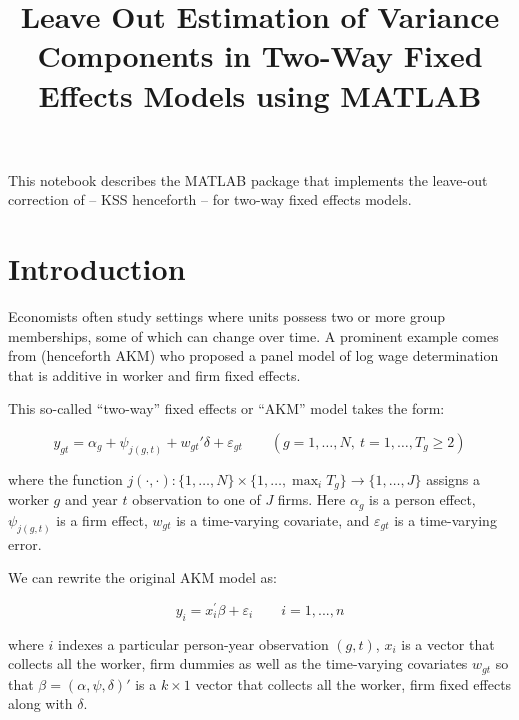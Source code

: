 \documentclass[11pt]{article}
\title{Leave Out Estimation of Variance Components in Two-Way Fixed Effects Models using MATLAB}
\begin{document}
    
        \maketitle
    
    

    
    This notebook describes the MATLAB package that implements the leave-out
correction of \cite*{kline2020leave} -- KSS henceforth -- for
two-way fixed effects models.

    \tableofcontents
    \newpage

    \hypertarget{introduction}{%
\section{Introduction}\label{introduction}}

Economists often study settings where units possess two or more group
memberships, some of which can change over time. A prominent example
comes from \cite{abowd1999high} (henceforth AKM) who
proposed a panel model of log wage determination that is additive in
worker and firm fixed effects.

This so-called ``two-way'' fixed effects or ``AKM'' model takes the
form:

\begin{equation}
    y_{gt} =  \alpha_{{g}} + \psi_{j({g},t)} + w_{gt}'\delta +  \varepsilon_{gt}  \qquad({g}=1,\dots,N, \ t=1,\dots,T_{g} \ge 2)
\end{equation}

where the function
\(j(\cdot ,\cdot ):\lbrace 1,\dots ,N\rbrace \times \lbrace 1,\dots ,\max_i T_g \rbrace \to \lbrace 1,\dots ,J\rbrace\)
assigns a worker \(g\) and year \(t\) observation to one of \(J\) firms.
Here \(\alpha_g\) is a person effect, \(\psi_{j(g,t)}\) is a firm
effect, \(w_{gt}\) is a time-varying covariate, and \(\varepsilon_{gt}\)
is a time-varying error.

We can rewrite the original AKM model as:

\begin{equation}
y_i =x_i^{\prime } \beta +\varepsilon_i \qquad i=1,...,n
\end{equation}

where \(i\) indexes a particular person-year observation \((g,t)\),
\(x_i\) is a vector that collects all the worker, firm dummies as well
as the time-varying covariates \(w_{gt}\) so that
\(\beta =(\alpha ,\psi ,\delta )'\) is a \(k\times 1\) vector that
collects all the worker, firm fixed effects along with \(\delta\).
\end{document}
